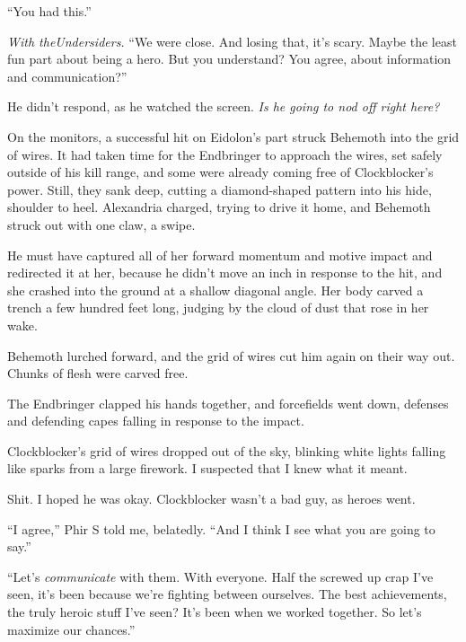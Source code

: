 ``You had this.''



\emph{With the}\emph{Undersiders.  }``We were close.  And losing that, it's scary.  Maybe the least fun part about being a hero.  But you understand?  You agree, about information and communication?''



He didn't respond, as he watched the screen.  \emph{Is he going to nod off right here?}



On the monitors, a successful hit on Eidolon's part struck Behemoth into the grid of wires.  It had taken time for the Endbringer to approach the wires, set safely outside of his kill range, and some were already coming free of Clockblocker's power.  Still, they sank deep, cutting a diamond-shaped pattern into his hide, shoulder to heel.  Alexandria charged, trying to drive it home, and Behemoth struck out with one claw, a swipe.



He must have captured all of her forward momentum and motive impact and redirected it at her, because he didn't move an inch in response to the hit, and she crashed into the ground at a shallow diagonal angle.  Her body carved a trench a few hundred feet long, judging by the cloud of dust that rose in her wake.



Behemoth lurched forward, and the grid of wires cut him again on their way out.  Chunks of flesh were carved free.



The Endbringer clapped his hands together, and forcefields went down, defenses and defending capes falling in response to the impact.



Clockblocker's grid of wires dropped out of the sky, blinking white lights falling like sparks from a large firework.  I suspected that I knew what it meant.



Shit.  I hoped he was okay.  Clockblocker wasn't a bad guy, as heroes went.



``I agree,'' Phir S told me, belatedly.  ``And I think I see what you are going to say.''



``Let's \emph{communicate} with them.  With everyone.  Half the screwed up crap I've seen, it's been because we're fighting between ourselves.  The best achievements, the truly heroic stuff I've seen?  It's been when we worked together.  So let's maximize our chances.''



